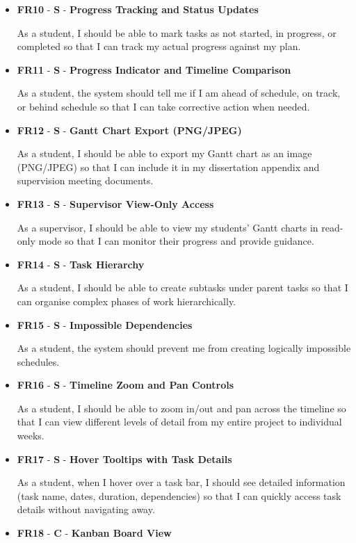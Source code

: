 \documentclass[12pt,nonacm,acmlarge,titlepage,screen]{acmart}
\begin{document}
\begin{itemize}
    As a student, when I modify a task's dates, the system should automatically update dependent tasks so that I maintain a logically consistent schedule.
    \item	\textbf{	FR10	}	-	\textbf{	S	}	-	\textbf{	Progress Tracking and Status Updates	}		
    
    As a student, I should be able to mark tasks as not started, in progress, or completed so that I can track my actual progress against my plan.
    \item	\textbf{	FR11	}	-	\textbf{	S	}	-	\textbf{	Progress Indicator and Timeline Comparison	}		
    
    As a student, the system should tell me if I am ahead of schedule, on track, or behind schedule so that I can take corrective action when needed.
    \item	\textbf{	FR12	}	-	\textbf{	S	}	-	\textbf{	Gantt Chart Export (PNG/JPEG)	}		
    
    As a student, I should be able to export my Gantt chart as an image (PNG/JPEG) so that I can include it in my dissertation appendix and supervision meeting documents.
    \item	\textbf{	FR13	}	-	\textbf{	S	}	-	\textbf{	Supervisor View-Only Access	}		
    
    As a supervisor, I should be able to view my students' Gantt charts in read-only mode so that I can monitor their progress and provide guidance.
    \item	\textbf{	FR14	}	-	\textbf{	S	}	-	\textbf{	Task Hierarchy 	}		
    
    As a student, I should be able to create subtasks under parent tasks so that I can organise complex phases of work hierarchically.
    \item	\textbf{	FR15	}	-	\textbf{	S	}	-	\textbf{	Impossible Dependencies	}		
    
    As a student, the system should prevent me from creating logically impossible schedules.
    \item	\textbf{	FR16	}	-	\textbf{	S	}	-	\textbf{	Timeline Zoom and Pan Controls	}		
    
    As a student, I should be able to zoom in/out and pan across the timeline so that I can view different levels of detail from my entire project to individual weeks.
    \item	\textbf{	FR17	}	-	\textbf{	S	}	-	\textbf{	Hover Tooltips with Task Details	}		
    
    As a student, when I hover over a task bar, I should see detailed information (task name, dates, duration, dependencies) so that I can quickly access task details without navigating away.
    \item	\textbf{	FR18	}	-	\textbf{	C	}	-	\textbf{	Kanban Board View	}		
    

\end{itemize}
\end{document}
